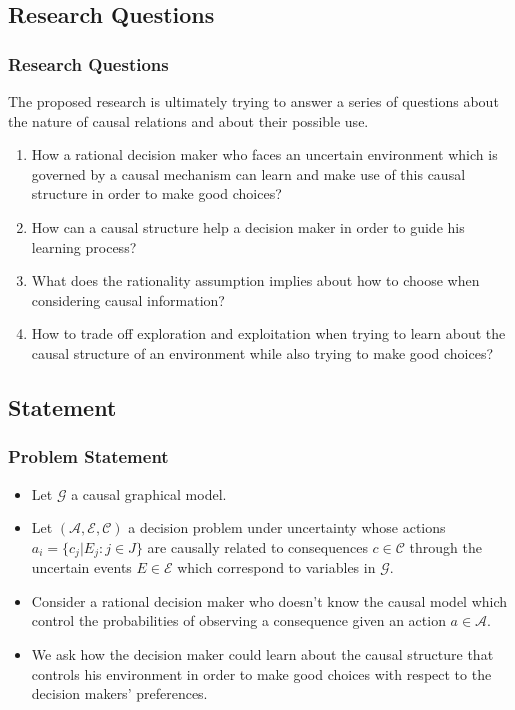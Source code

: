 \documentclass{beamer}
\theoremstyle{plain}
\begin{document}
	\subsection{Research Questions}
	\begin{frame}
	\frametitle{Research Questions}
	The proposed research is ultimately trying to answer a series of questions about the nature of causal relations and about their possible use.
	\begin{enumerate}
	\item How a rational decision maker who faces an uncertain environment which is governed by a causal mechanism can learn and make use of this causal structure in order to make good    	choices? 
	\item How can a causal structure help a decision maker in order to guide his learning process? 
	\item What does the rationality assumption implies about how to choose when considering causal information? 
\item How to trade off exploration and exploitation when trying to learn about the causal structure of an environment while also trying to make good choices?
\end{enumerate}
\end{frame}

\subsection{Statement}
	\begin{frame}
	\frametitle{Problem Statement}
	\begin{itemize}
	\item Let  $\mathcal{G}$ a causal graphical model.
	\item Let $(\mathcal{A},\mathcal{E},\mathcal{C})$ a decision problem under uncertainty whose actions $a_i = \{ c_j | E_j : j \in J \}$  are causally related to consequences $c \in \mathcal{C}$ through the uncertain events $E \in \mathcal{E}$ which correspond to variables in $\mathcal{G}$. 
	\item Consider a rational decision maker who doesn't know the causal model which control the probabilities of observing a consequence given an action $a \in \mathcal{A}$.
	\item We ask how the decision maker could learn about the causal structure that controls his environment in order to make good choices with respect to the decision makers' preferences.
	\end{itemize}
	\end{frame}
\end{document}
